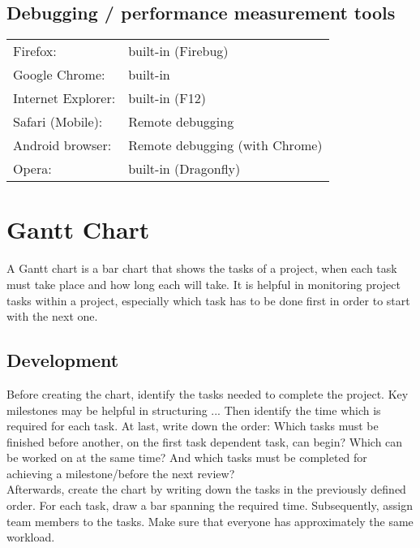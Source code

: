\documentclass[twoside,12pt,a4paper]{article}
\begin{document}
\subsection{Debugging / performance measurement tools} %
\label{sub:debugging_tools}

\begin{tabular}{ll}
Firefox:				& built-in (Firebug) \\
Google Chrome: 		& built-in \\
Internet Explorer:	& built-in (F12) \\
Safari (Mobile):	& Remote debugging \\
Android browser:	& Remote debugging (with Chrome) \\
Opera:				& built-in (Dragonfly) \\
\end{tabular}




\newpage

\section{Gantt Chart} %
\label{sec:gantt_chart}

A Gantt chart is a bar chart that shows the tasks of a project, when each task must take place and how long each will take. It is helpful in monitoring project tasks within a project, especially which task has to be done first in order to start with the next one.


\subsection{Development} %
\label{sub:development}
Before creating the chart, identify the tasks needed to complete the project. Key milestones may be helpful in structuring ... Then identify the time which is required for each task. At last, write down the order: Which tasks must be finished before another, on the first task dependent task, can begin? Which can be worked on at the same time? And which tasks must be completed for achieving a milestone/before the next review? \\
Afterwards, create the chart by writing down the tasks in the previously defined order. For each task, draw a bar spanning the required time. Subsequently, assign team members to the tasks. Make sure that everyone has approximately the same workload.
\end{document}
